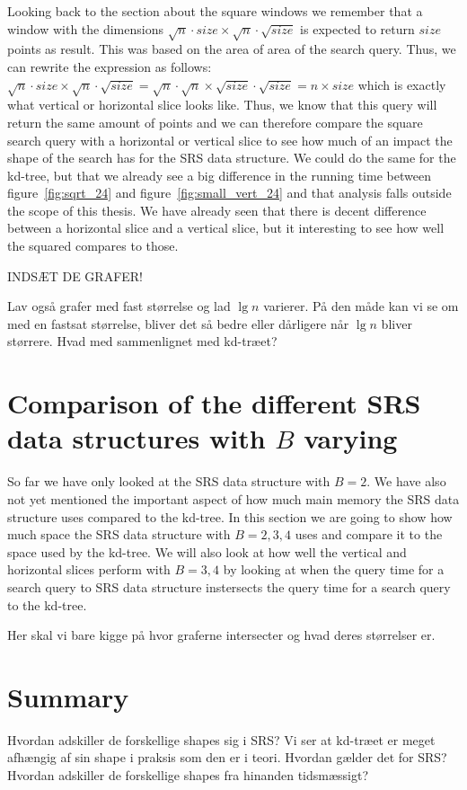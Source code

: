 Looking back to the section about the square windows we remember that a window with the dimensions $\sqrt{n}\cdot{size} \times \sqrt{n}\cdot\sqrt{size}$ is expected to return $size$ points as result. This was based on the area of area of the search query. Thus, we can rewrite the expression as follows: $\sqrt{n}\cdot{size} \times \sqrt{n}\cdot\sqrt{size} = \sqrt{n}\cdot\sqrt{n} \times \sqrt{size}\cdot\sqrt{size} = n \times size$ which is exactly what vertical or horizontal slice looks like. Thus, we know that this query will return the same amount of points and we can therefore compare the square search query with a horizontal or vertical slice to see how much of an impact the shape of the search has for the SRS data structure. We could do the same for the kd-tree, but that we already see a big difference in the running time between figure~\ref{fig:sqrt_24} and figure~\ref{fig:small_vert_24} and that analysis falls outside the scope of this thesis.  We have already seen that there is decent difference between a horizontal slice and a vertical slice, but it interesting to see how well the squared compares to those. 

INDSÆT DE GRAFER!


Lav også grafer med fast størrelse og lad $\lg n$ varierer. På den måde kan vi se om med en fastsat størrelse, bliver det så bedre eller dårligere når $\lg n$ bliver størrere. Hvad med sammenlignet med kd-træet?

\section{Comparison of the different SRS data structures with $B$ varying}

So far we have only looked at the SRS data structure with $B=2$. We have also not yet mentioned the important aspect of how much main memory the SRS data structure uses compared to the kd-tree. In this section we are going to show how much space the SRS data structure with $B={2,3,4}$ uses and compare it to the space used by the kd-tree. We will also look at how well the vertical and horizontal slices perform with $B={3,4}$ by looking at when the query time for a search query to SRS data structure instersects the query time for a search query to the kd-tree. 

Her skal vi bare kigge på hvor graferne intersecter og hvad deres størrelser er.

\section{Summary}

Hvordan adskiller de forskellige shapes sig i SRS? Vi ser at kd-træet er meget afhængig af sin shape i praksis som den er i teori. Hvordan gælder det for SRS? Hvordan adskiller de forskellige shapes fra hinanden tidsmæssigt? 

